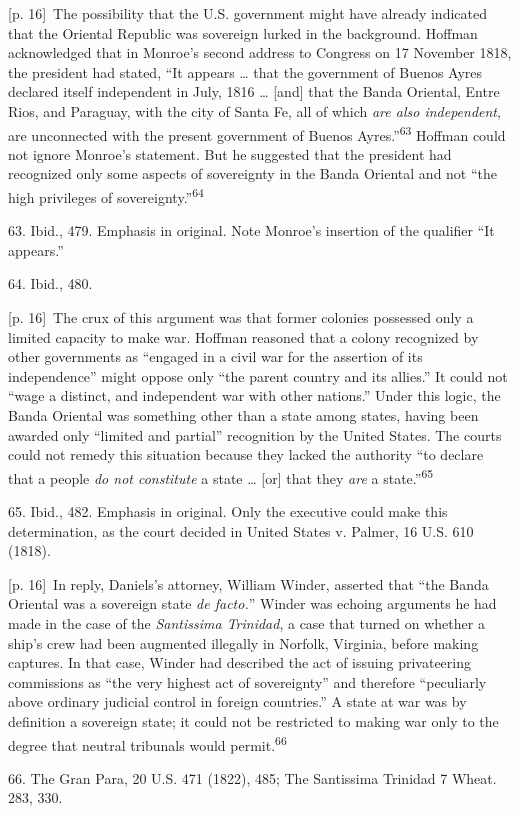 \documentclass[10pt,a4paper]{article}
\begin{document}
{\scriptsize\color{gray} [p. 16]}\ The possibility that the U.S. government might have already indicated that the Oriental Republic was sovereign lurked in the background. Hoffman acknowledged that in Monroe’s second address to Congress on 17 November 1818, the president had stated, “It appears … that the government of Buenos Ayres declared itself independent in July, 1816 … [and] that the Banda Oriental, Entre Rios, and Paraguay, with the city of Santa Fe, all of which \textit{are also independent}, are unconnected with the present government of Buenos Ayres.”\nobreak\textsuperscript{63} Hoffman could not ignore Monroe’s statement. But he suggested that the president had recognized only some aspects of sovereignty in the Banda Oriental and not “the high privileges of sovereignty.”\nobreak\textsuperscript{64}\par{\small 63. Ibid., 479. Emphasis in original. Note Monroe’s insertion of the qualifier “It appears.”\par}{\small 64. Ibid., 480.\par}
{\scriptsize\color{gray} [p. 16]}\ The crux of this argument was that former colonies possessed only a limited capacity to make war. Hoffman reasoned that a colony recognized by other governments as “engaged in a civil war for the assertion of its independence” might oppose only “the parent country and its allies.” It could not “wage a distinct, and independent war with other nations.” Under this logic, the Banda Oriental was something other than a state among states, having been awarded only “limited and partial” recognition by the United States. The courts could not remedy this situation because they lacked the authority “to declare that a people \textit{do not constitute} a state … [or] that they \textit{are} a state.”\nobreak\textsuperscript{65}\par{\small 65. Ibid., 482. Emphasis in original. Only the executive could make this determination, as the court decided in United States v. Palmer, 16 U.S. 610 (1818).\par}
{\scriptsize\color{gray} [p. 16]}\ In reply, Daniels’s attorney, William Winder, asserted that “the Banda Oriental was a sovereign state \textit{de facto.}” Winder was echoing arguments he had made in the case of the \textit{Santissima Trinidad}, a case that turned on whether a ship’s crew had been augmented illegally in Norfolk, Virginia, before making captures. In that case, Winder had described the act of issuing privateering commissions as “the very highest act of sovereignty” and therefore “peculiarly above ordinary judicial control in foreign countries.” A state at war was by definition a sovereign state; it could not be restricted to making war only to the degree that neutral tribunals would permit.\nobreak\textsuperscript{66}\par{\small 66. The Gran Para, 20 U.S. 471 (1822), 485; The Santissima Trinidad 7 Wheat. 283, 330.\par}
\end{document}
